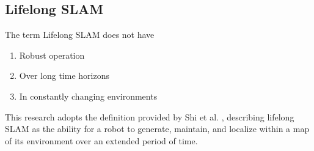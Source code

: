 \subsection{Lifelong SLAM}

The term Lifelong SLAM does not have 
\begin{singlespace}
    \begin{enumerate}
        \item Robust operation
        \item Over long time horizons
        \item In constantly changing environments
    \end{enumerate}
\end{singlespace}
This research adopts the definition provided by Shi et al. \cite{shiAreWeReady2020}, describing lifelong SLAM as the ability for a robot to generate, maintain, and localize within a map of its environment over an extended period of time. 